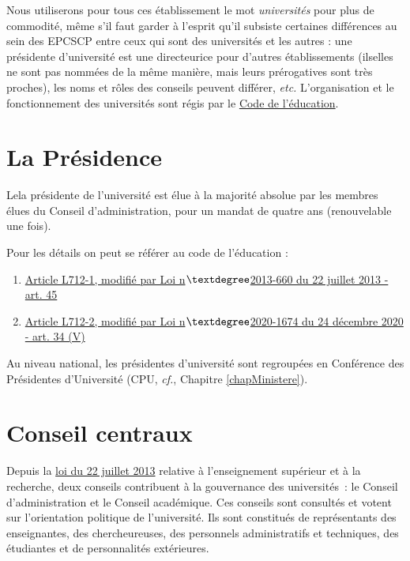 Nous utiliserons pour tous ces \'etablissement le mot \textit{universit\'es} pour plus de commodit\'e,
m\^eme s'il faut garder \`a l'esprit qu'il subsiste certaines diff\'erences au sein des EPCSCP entre ceux
qui sont des universit\'es et les autres : un\mp e pr\'esident\mp e d'universit\'e est un\mp e directeur\mp ice pour d'autres \'etablissements (ils\mp elles ne sont pas nomm\'e\mp e\mp s de la m\^eme mani\`ere, mais leurs pr\'erogatives sont
tr\`es proches), les noms et r\^oles des conseils peuvent diff\'erer, {\em etc.} L'organisation et le fonctionnement des universit\'es sont r\'egis par le \href{http://www.legifrance.gouv.fr/affichCode.do?cidTexte=LEGITEXT000006071191}{Code de l'\'education}. 



\section{La Pr\'esidence}
Le\mp la pr\'esident\mp e de l'universit\'e est \'elu\mp e \`a la majorit\'e absolue par les membres \'elu\mp e\mp s du Conseil d'administration, pour un mandat de quatre ans (renouvelable une fois). 

Pour les d\'etails on peut se r\'ef\'erer au code de l'\'education :
\begin{enumerate}
 \item \href{https://www.legifrance.gouv.fr/affichCodeArticle.do;jsessionid=C8BFF801F2976E9272297AB33338C553.tpdila14v_3?idArticle=LEGIARTI000027747943&cidTexte=LEGITEXT000006071191&dateTexte=20170113}{Article L712-1, modifi\'e par Loi n$\textdegree$2013-660 du 22 juillet 2013 - art. 45}
 \item \href{https://www.legifrance.gouv.fr/codes/article_lc/LEGIARTI000027747947/2023-04-15/}{Article L712-2, modifi\'e par Loi n$\textdegree$2020-1674 du 24 d\'ecembre 2020 - art. 34 (V)}
\end{enumerate}

Au niveau national, les pr\'esident\mp e\mp s d'universit\'e sont regroup\'e\mp e\mp s en Conf\'erence des Pr\'esident\mp e\mp s d'Universit\'e (CPU, {\em cf.}, Chapitre \ref{chapMinistere}).

\section{Conseil centraux}
Depuis la \href{https://www.legifrance.gouv.fr/affichTexte.do;jsessionid=C8BFF801F2976E9272297AB33338C553.tpdila14v_3?cidTexte=JORFTEXT000027735009&dateTexte=20170113}{loi du 22 juillet 2013} relative {\`a} l'enseignement sup{\'e}rieur et {\`a} la recherche, deux conseils contribuent \`a la gouvernance des universit\'es~: le Conseil d'administration et le Conseil acad{\'e}mique. Ces conseils sont consult\'es et votent sur 
l'orientation politique de l'universit{\'e}. Ils sont constitu\'es de repr{\'e}sentants des enseignant\mp e\mp s, des chercheur\mp euse\mp s, des personnels administratifs et techniques, des {\'e}tudiant\mp e\mp s et de personnalit{\'e}s ext{\'e}rieures. 


